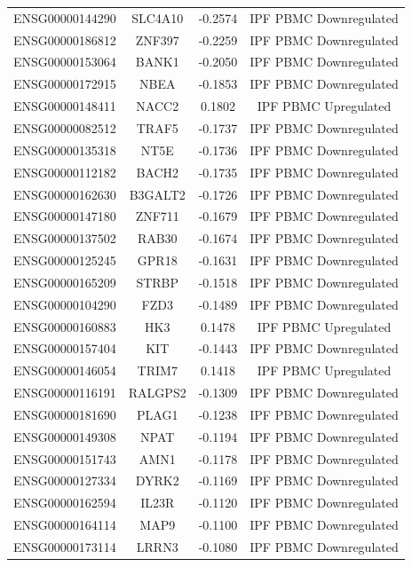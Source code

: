 \documentclass[
]{article}
\begin{document}
\begin{singlespace}
\begin{longtable}[t]{lccc}
\endfoot
\bottomrule
\endlastfoot
ENSG00000144290 & SLC4A10 & -0.2574 & IPF PBMC Downregulated\\
ENSG00000186812 & ZNF397 & -0.2259 & IPF PBMC Downregulated\\
ENSG00000153064 & BANK1 & -0.2050 & IPF PBMC Downregulated\\
ENSG00000172915 & NBEA & -0.1853 & IPF PBMC Downregulated\\
ENSG00000148411 & NACC2 & 0.1802 & IPF PBMC Upregulated\\
\addlinespace
ENSG00000082512 & TRAF5 & -0.1737 & IPF PBMC Downregulated\\
ENSG00000135318 & NT5E & -0.1736 & IPF PBMC Downregulated\\
ENSG00000112182 & BACH2 & -0.1735 & IPF PBMC Downregulated\\
ENSG00000162630 & B3GALT2 & -0.1726 & IPF PBMC Downregulated\\
ENSG00000147180 & ZNF711 & -0.1679 & IPF PBMC Downregulated\\
\addlinespace
ENSG00000137502 & RAB30 & -0.1674 & IPF PBMC Downregulated\\
ENSG00000125245 & GPR18 & -0.1631 & IPF PBMC Downregulated\\
ENSG00000165209 & STRBP & -0.1518 & IPF PBMC Downregulated\\
ENSG00000104290 & FZD3 & -0.1489 & IPF PBMC Downregulated\\
ENSG00000160883 & HK3 & 0.1478 & IPF PBMC Upregulated\\
\addlinespace
ENSG00000157404 & KIT & -0.1443 & IPF PBMC Downregulated\\
ENSG00000146054 & TRIM7 & 0.1418 & IPF PBMC Upregulated\\
ENSG00000116191 & RALGPS2 & -0.1309 & IPF PBMC Downregulated\\
ENSG00000181690 & PLAG1 & -0.1238 & IPF PBMC Downregulated\\
ENSG00000149308 & NPAT & -0.1194 & IPF PBMC Downregulated\\
\addlinespace
ENSG00000151743 & AMN1 & -0.1178 & IPF PBMC Downregulated\\
ENSG00000127334 & DYRK2 & -0.1169 & IPF PBMC Downregulated\\
ENSG00000162594 & IL23R & -0.1120 & IPF PBMC Downregulated\\
ENSG00000164114 & MAP9 & -0.1100 & IPF PBMC Downregulated\\
ENSG00000173114 & LRRN3 & -0.1080 & IPF PBMC Downregulated\\

\end{longtable}
\end{singlespace}
\end{document}
